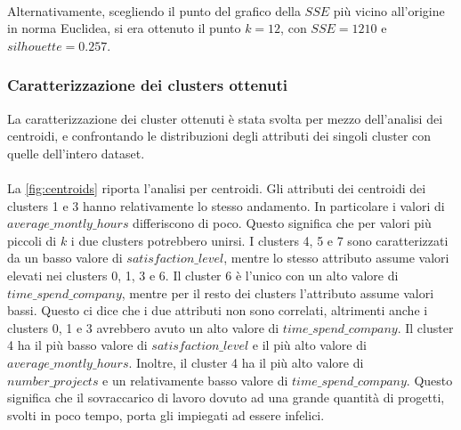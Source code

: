 \documentclass[10pt,a4paper,twocolumn]{article}
\begin{document}
\paragraph{}
Alternativamente, scegliendo il punto del grafico della $SSE$ più vicino all'origine in norma Euclidea, si era ottenuto il punto $k=12$, con $SSE=1210$ e $silhouette=0.257$.

\subsubsection{Caratterizzazione dei clusters ottenuti}
La caratterizzazione dei cluster ottenuti è stata svolta per mezzo dell'analisi dei centroidi, e confrontando le distribuzioni degli attributi dei singoli cluster con quelle dell'intero dataset.
\paragraph{}
La \autoref{fig:centroids} riporta l'analisi per centroidi. Gli attributi dei centroidi dei clusters 1 e 3 hanno relativamente lo stesso andamento. In particolare i valori di $average\_montly\_hours$ differiscono di poco. Questo significa che per valori più piccoli di $k$ i due clusters potrebbero unirsi. I clusters 4, 5 e 7 sono caratterizzati da un basso valore di $satisfaction\_level$, mentre lo stesso attributo assume valori elevati nei clusters 0, 1, 3 e 6. Il cluster 6 è l'unico con un alto valore di $time\_spend\_company$, mentre per il resto dei clusters l'attributo assume valori bassi. Questo ci dice che i due attributi non sono correlati, altrimenti anche i clusters 0, 1 e 3 avrebbero avuto un alto valore di $time\_spend\_company$. Il cluster 4 ha il più basso valore di $satisfaction\_level$ e il più alto valore di  $average\_montly\_hours$. Inoltre, il cluster 4 ha il più alto valore di $number\_projects$ e un relativamente basso valore di $time\_spend\_company$. Questo significa che il sovraccarico di lavoro dovuto ad una grande quantità di progetti, svolti in poco tempo, porta gli impiegati ad essere infelici.
\end{document}
